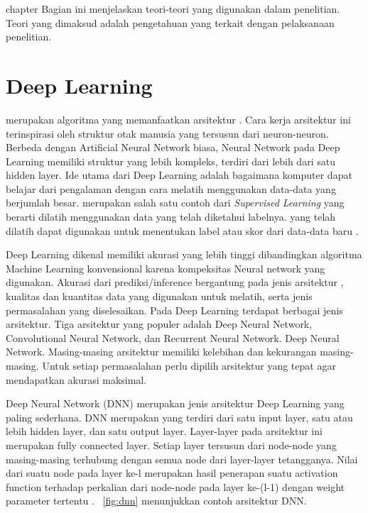 chapter{\babDua}
Bagian ini menjelaskan teori-teori yang digunakan dalam penelitian. Teori yang dimaksud adalah pengetahuan yang terkait dengan pelaksanaan penelitian.

\section{Deep Learning}
\deeplearning merupakan algoritma \ml yang memanfaatkan arsitektur \nn. Cara kerja arsitektur ini terinspirasi oleh struktur otak manusia yang tersusun dari neuron-neuron. Berbeda dengan Artificial Neural Network biasa, Neural Network pada Deep Learning memiliki struktur yang lebih kompleks, terdiri dari lebih dari satu hidden layer. Ide utama dari Deep Learning adalah bagaimana komputer dapat belajar dari pengalaman dengan cara melatih \nn menggunakan data-data yang berjumlah besar. \deeplearning merupakan salah satu contoh dari \textit{Supervised Learning} yang berarti \nn dilatih menggunakan data yang telah diketahui labelnya. \nn yang telah dilatih dapat digunakan untuk menentukan label atau skor dari data-data baru \cite{deeplearning2}. 

Deep Learning dikenal memiliki akurasi yang lebih tinggi dibandingkan algoritma Machine Learning konvensional karena kompeksitas Neural network yang digunakan. Akurasi dari prediksi/inference bergantung pada jenis arsitektur \nn, kualitas dan kuantitas data yang digunakan untuk melatih, serta jenis permasalahan yang diselesaikan. Pada Deep Learning terdapat berbagai jenis arsitektur. Tiga arsitektur yang populer adalah Deep Neural Network, Convolutional Neural Network, dan Recurrent Neural Network. Deep Neural Network. Masing-masing arsitektur memiliki kelebihan dan kekurangan masing-masing. Untuk setiap permasalahan perlu dipilih arsitektur yang tepat agar mendapatkan akurasi maksimal.

Deep Neural Network (DNN) merupakan jenis arsitektur Deep Learning yang paling sederhana. DNN merupakan \nn yang terdiri dari satu input layer, satu atau lebih hidden layer, dan satu output layer. Layer-layer pada arsitektur ini merupakan fully connected layer. Setiap layer tersusun dari node-node yang masing-masing terhubung dengan semua node dari layer-layer tetangganya. Nilai dari suatu node pada layer ke-l merupakan hasil penerapan suatu activation function terhadap perkalian dari node-node pada layer ke-(l-1) dengan weight parameter tertentu \cite{deeplearningmatrix}. \pic~\ref{fig:dnn} menunjukkan contoh arsitektur DNN.

